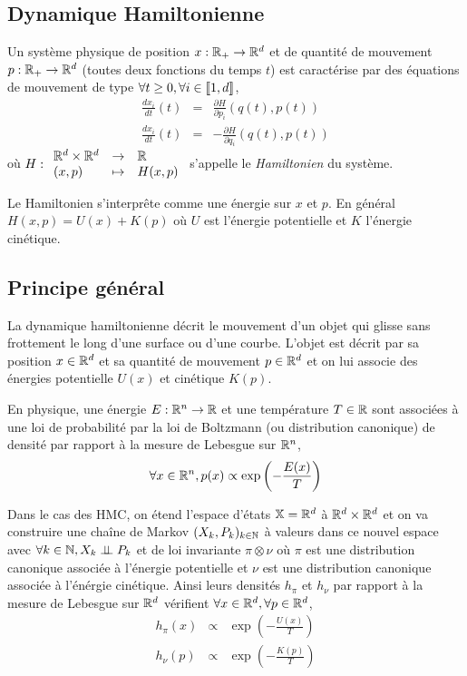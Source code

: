 \documentclass[10pt,a4paper]{article}
\begin{document}
\subsection{Dynamique Hamiltonienne}
Un système physique de position $x : \mathbb{R}_+ \to \mathbb{R}^d$ et de quantité de mouvement $p : \mathbb{R}_+ \to \mathbb{R}^d$ (toutes deux fonctions du temps $t$) est caractérise par des équations de mouvement de type $\forall t \geq 0, \forall i \in {\left\llbracket 1,d \right\rrbracket}$, 
\begin{eqnarray*}
  \frac{d x_i}{d t}(t) &=& \frac{\partial H}{\partial p_i} (q(t), p(t)) \\
  \frac{d x_i}{d t} (t) &=& -\frac{\partial H}{\partial q_i} (q(t), p(t))
\end{eqnarray*}
où $H : { \begin{array}{lcl} \mathbb{R}^d \times \mathbb{R}^d & \to & \mathbb{R} \\ (x,p) & \mapsto & H(x,p) \end{array} }$ s'appelle le {\it Hamiltonien} du système.

Le Hamiltonien s'interprête comme une énergie sur $x$ et $p$. En général $H(x,p) = U(x) + K(p)$ où $U$ est l'énergie potentielle et $K$ l'énergie cinétique.

\subsection{Principe général}
La dynamique hamiltonienne décrit le mouvement d'un objet qui glisse sans frottement le long d'une surface ou d'une courbe. L'objet est décrit par sa position $x \in \mathbb{R}^d$ et sa quantité de mouvement $p \in \mathbb{R}^d$ et on lui associe des énergies potentielle $U(x)$ et cinétique $K(p)$.

\begin{Def}
En physique, une énergie $E : \mathbb{R}^n \to \mathbb{R}$ et une température $T \in \mathbb{R}$ sont associées à une loi de probabilité par la loi de Boltzmann (ou distribution canonique) de densité par rapport à la mesure de Lebesgue sur $\mathbb{R}^n$,
$$\forall x \in \mathbb{R}^n,  p(x) \propto \exp \left( -\frac{E(x)}{T} \right)$$
\end{Def}


Dans le cas des HMC, on étend l'espace d'états $\mathbb{X} = \mathbb{R}^d$ à $\mathbb{R}^d \times \mathbb{R}^d$ et on va construire une chaîne de Markov $(X_k, P_k)_{k \in \mathbb{N}}$ à valeurs dans ce nouvel espace avec $\forall k \in \mathbb{N}, X_k \perp\!\!\!\perp P_k$ et de loi invariante $\pi \otimes \nu$ où $\pi$ est une distribution canonique associée à l'énergie potentielle et $\nu$ est une distribution canonique associée à l'énérgie cinétique. Ainsi leurs densités $h_\pi$ et $h_\nu$ par rapport à la mesure de Lebesgue sur $\mathbb{R}^d$ vérifient $\forall x \in \mathbb{R}^d, \forall p \in \mathbb{R}^d$,
\begin{eqnarray*}
  h_\pi(x) & \propto &  \exp \left( -\frac{U(x)}{T} \right) \\
  h_\nu(p) & \propto &  \exp \left( -\frac{K(p)}{T} \right)
\end{eqnarray*}
\end{document}
